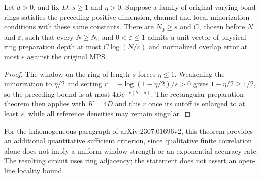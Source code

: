 \begin{lemma}
    \label{thm:ldp_rectangular_window_preparation}
    \leanok
    Let $d>0$, and fix $D$, $s\ge1$ and $\eta>0$. Suppose a family of original
    varying-bond rings satisfies the preceding positive-dimension, channel and local
    minorization conditions with these same constants. There are $N_0\ge s$ and $C$,
    chosen before $N$ and $\varepsilon$, such that every $N\ge N_0$ and
    $0<\varepsilon\le1$ admits a unit vector of physical ring preparation depth
    at most $C\log(N/\varepsilon)$ and normalized overlap error at most
    $\varepsilon$ against the original MPS.
\end{lemma}
\begin{proof}\leanok
    The window on the ring of length $s$ forces $\eta\le1$. Weakening the minorization
    to $\eta/2$ and setting $r=-\log(1-\eta/2)/s>0$ gives
    $1-\eta/2\ge1/2$, so the preceding bound is at most $4D e^{-r(b-a)}$.
    The rectangular preparation theorem then applies with $K=4D$ and this $r$
    once its cutoff is enlarged to at least $s$, while all reference densities may remain singular.
\end{proof}

For the inhomogeneous paragraph of arXiv:2307.01696v2, this theorem provides an
additional quantitative sufficient criterion, since qualitative finite correlation alone
does not imply a uniform window strength or an exponential accuracy rate. The resulting circuit
uses ring adjacency; the statement does not assert an open-line locality bound.
